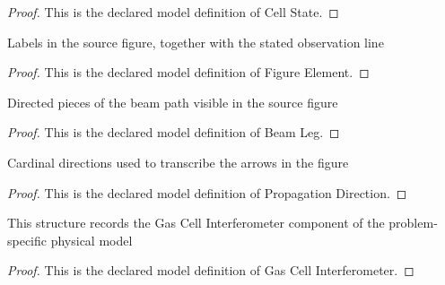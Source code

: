 \begin{proof}
  This is the declared model definition of Cell State.
\end{proof}
\begin{definition}
  \label{def:physics:phyx-mini-0152:phyxminiproblems-problemphyxmini0152-figureelement}
  Labels in the source figure, together with the stated observation line
\end{definition}
\begin{proof}
  This is the declared model definition of Figure Element.
\end{proof}
\begin{definition}
  \label{def:physics:phyx-mini-0152:phyxminiproblems-problemphyxmini0152-beamleg}
  Directed pieces of the beam path visible in the source figure
\end{definition}
\begin{proof}
  This is the declared model definition of Beam Leg.
\end{proof}
\begin{definition}
  \label{def:physics:phyx-mini-0152:phyxminiproblems-problemphyxmini0152-propagationdirection}
  Cardinal directions used to transcribe the arrows in the figure
\end{definition}
\begin{proof}
  This is the declared model definition of Propagation Direction.
\end{proof}
\begin{definition}
  \label{def:physics:phyx-mini-0152:phyxminiproblems-problemphyxmini0152-gascellinterferometer}
  This structure records the Gas Cell Interferometer component of the problem-specific physical model
\end{definition}
\begin{proof}
  This is the declared model definition of Gas Cell Interferometer.
\end{proof}
